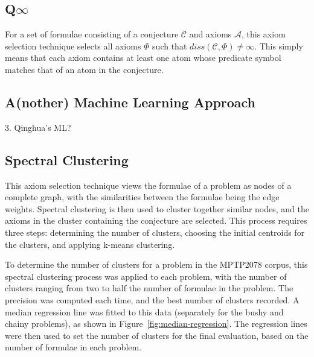 \documentclass[EPiC]{easychair}
\begin{document}
\subsection{Q$\infty$}
\label{QinghuaInf}

For a set of formulae consisting of a conjecture $\mathcal{C}$ and axioms 
$\mathcal{A}$, this axiom selection technique selects all axioms $\Phi$
such that $diss(\mathcal{C},\Phi) \neq \infty$.
This simply means that each axiom contains at least one atom whose predicate
symbol matches that of an atom in the conjecture.

\subsection{A(nother) Machine Learning Approach}
\label{QinghuaML}

3. Qinghua's ML?
\subsection{Spectral Clustering}
\label{Zishi}

This axiom selection technique views the formulae of a problem as nodes
of a complete graph, with the similarities between the formulae being the 
edge weights.
Spectral clustering \cite{vLu07} is then used to cluster together similar 
nodes, and the axioms in the cluster containing the conjecture are selected.
This process requires three steps:
determining the number of clusters,
choosing the initial centroids for the clusters,
and
applying k-means clustering.

To determine the number of clusters for a problem in the MPTP2078 corpus,
this spectral clustering process was applied to each problem, with the 
number of clusters ranging from two to half the number of formulae in the 
problem.
The precision was computed each time, and the best number of clusters
recorded.
A median regression line was fitted to this data (separately for the
bushy and chainy problems), as shown in Figure~\ref{fig:median-regression}.
The regression lines were then used to set the number of clusters for
the final evaluation, based on the number of formulae in each problem.
\end{document}
